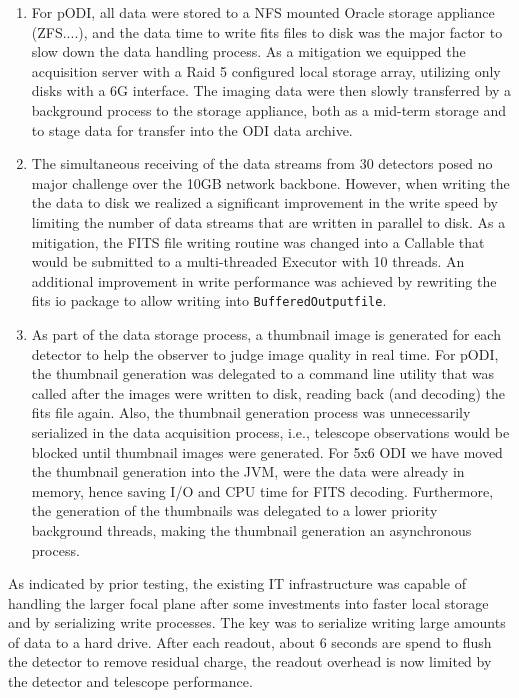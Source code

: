 \documentclass[]{spieman}
\begin{document}
\begin{enumerate} 
    
\item For pODI, all data were stored to a NFS mounted Oracle storage appliance
(ZFS....), and the data time to write fits files to disk was the major factor to
slow down the data handling process. As a mitigation we equipped the acquisition
server with a Raid 5 configured local storage array, utilizing only disks with a
6G interface. The imaging data were then slowly transferred by a background
process to the storage appliance, both as a mid-term storage and to stage data
for transfer into the ODI data archive.

\item  The simultaneous receiving of the data streams from 30 detectors posed no
major challenge over the 10GB network backbone.  However, when writing the the
data to disk we realized a significant  improvement in the write speed by
limiting the number of data streams that are written in parallel to disk. As a
mitigation, the FITS file writing routine was changed into a Callable that would
be submitted to a multi-threaded Executor with 10 threads. An additional
improvement in write performance was achieved by rewriting the fits io package
to allow writing into {\tt BufferedOutputfile}.

\item As part of the data storage process, a thumbnail image is generated for
each detector to help the observer to judge image quality in real time. For
pODI, the thumbnail generation was delegated to a command line utility that was
called after the images were written to disk, reading back (and decoding) the
fits file again. Also, the thumbnail generation process was unnecessarily
serialized in the data acquisition process, i.e., telescope observations would
be blocked until thumbnail images were generated.  For 5x6 ODI we have moved the
thumbnail generation into the JVM, were the data were already in memory, hence
saving I/O and CPU time for FITS decoding. Furthermore, the generation of the
thumbnails was delegated to a lower priority background threads, making the
thumbnail generation an asynchronous process.

    
\end{enumerate}

As indicated by prior testing, the existing IT infrastructure was capable of
handling the larger focal plane after some investments into faster local
storage and by serializing write processes. The key was to serialize writing
large amounts of data to a hard drive. After each readout, about 6 seconds
are spend to flush the detector to remove residual charge, the readout
overhead is now limited by the detector and telescope performance.
\end{document}
